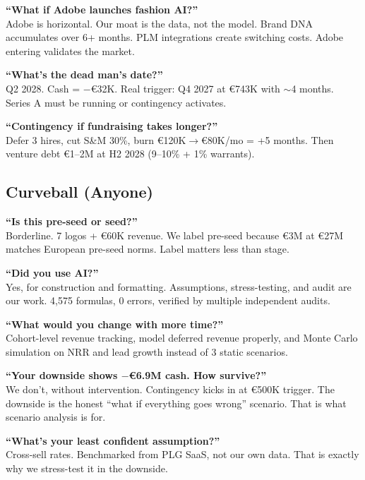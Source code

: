 \documentclass[11pt,a4paper]{article}
\begin{document}
\textbf{``What if Adobe launches fashion AI?''}\\
Adobe is horizontal. Our moat is the data, not the model. Brand DNA accumulates over 6+ months. PLM integrations create switching costs. Adobe entering validates the market.

\textbf{``What's the dead man's date?''}\\
Q2 2028. Cash = $-$\euro{}32K. Real trigger: Q4 2027 at \euro{}743K with $\sim$4 months. Series A must be running or contingency activates.

\textbf{``Contingency if fundraising takes longer?''}\\
Defer 3 hires, cut S\&M 30\%, burn \euro{}120K$\to$\euro{}80K/mo = +5 months. Then venture debt \euro{}1--2M at H2 2028 (9--10\% + 1\% warrants).

\subsection{Curveball (Anyone)}

\textbf{``Is this pre-seed or seed?''}\\
Borderline. 7 logos + \euro{}60K revenue. We label pre-seed because \euro{}3M at \euro{}27M matches European pre-seed norms. Label matters less than stage.

\textbf{``Did you use AI?''}\\
Yes, for construction and formatting. Assumptions, stress-testing, and audit are our work. 4,575 formulas, 0 errors, verified by multiple independent audits.

\textbf{``What would you change with more time?''}\\
Cohort-level revenue tracking, model deferred revenue properly, and Monte Carlo simulation on NRR and lead growth instead of 3 static scenarios.

\textbf{``Your downside shows $-$\euro{}6.9M cash. How survive?''}\\
We don't, without intervention. Contingency kicks in at \euro{}500K trigger. The downside is the honest ``what if everything goes wrong'' scenario. That is what scenario analysis is for.

\textbf{``What's your least confident assumption?''}\\
Cross-sell rates. Benchmarked from PLG SaaS, not our own data. That is exactly why we stress-test it in the downside.

\vspace{8pt}
\begin{center}
\end{center}
\end{document}
